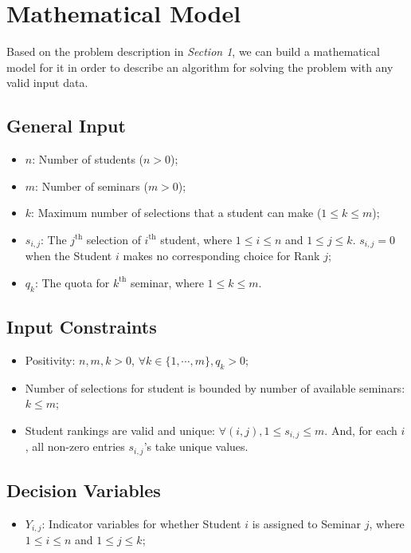 \documentclass{article} %
\begin{document}
\section{Mathematical Model}
\par\qquad Based on the problem description in \emph{Section 1}, we can build a mathematical model for it in order to describe an algorithm for solving the problem with any valid input data.

\subsection{General Input}
\begin{itemize}
    \item $n$: Number of students ($n > 0$);
    \item $m$: Number of seminars ($m > 0$);
    \item $k$: Maximum number of selections that a student can make ($1 \leq k \leq m$);
    \item $s_{i,j}$: The $j^{\text{th}}$ selection of $i^{\text{th}}$ student, where $1\leq i \leq n$ and $1\leq j \leq k$. $s_{i,j}=0$ when the Student $i$ makes no corresponding choice for Rank $j$;
    \item $q_k$: The quota for $k^{\text{th}}$ seminar, where $1\leq k \leq m$.
\end{itemize}

\subsection{Input Constraints}
\begin{itemize}
    \item Positivity: $n,m,k>0$, $\forall k\in\{1,\cdots,m\}, q_k>0$;
    \item Number of selections for student is bounded by number of available seminars: $k \leq m$;
    \item Student rankings are valid and unique: $\forall (i,j), 1\leq s_{i,j} \leq m$. And, for each $i$, all non-zero entries $s_{i,j}$'s take unique values.
\end{itemize}

\subsection{Decision Variables}
\begin{itemize}
    \item $Y_{i,j}$: Indicator variables for whether Student $i$ is assigned to Seminar $j$, where $1\leq i \leq n$ and $1\leq j \leq k$;
\end{itemize}
\end{document}
